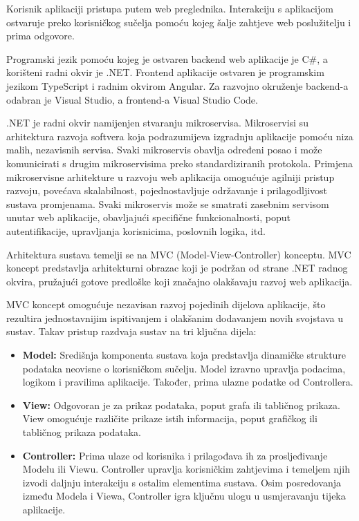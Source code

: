 		{Korisnik aplikaciji pristupa putem web preglednika. Interakciju s aplikacijom ostvaruje preko korisničkog sučelja pomoću kojeg šalje zahtjeve web poslužitelju i prima odgovore.
			
			Programski jezik pomoću kojeg je ostvaren backend web aplikacije je C\#, a korišteni radni okvir je .NET. Frontend aplikacije ostvaren je programskim jezikom
			TypeScript i radnim okvirom Angular. Za razvojno okruženje backend-a odabran je Visual Studio, a frontend-a Visual Studio Code.
			
			.NET je radni okvir namijenjen stvaranju mikroservisa. Mikroservisi su arhitektura razvoja softvera koja podrazumijeva izgradnju aplikacije pomoću niza malih, nezavisnih servisa. Svaki mikroservis obavlja određeni posao i može komunicirati s drugim mikroservisima preko standardiziranih protokola. Primjena mikroservisne arhitekture u razvoju web aplikacija omogućuje agilniji pristup razvoju, povećava skalabilnost, pojednostavljuje održavanje i prilagodljivost sustava promjenama. Svaki mikroservis može se smatrati zasebnim servisom unutar web aplikacije, obavljajući specifične funkcionalnosti, poput autentifikacije, upravljanja korisnicima, poslovnih logika, itd.
			
			Arhitektura sustava temelji se na MVC (Model-View-Controller) konceptu. MVC koncept predstavlja arhitekturni obrazac koji je podržan od strane .NET radnog okvira, pružajući gotove predloške koji značajno olakšavaju razvoj web aplikacija.
			
			MVC koncept omogućuje nezavisan razvoj pojedinih dijelova aplikacije, što rezultira jednostavnijim ispitivanjem i olakšanim dodavanjem novih svojstava u sustav. Takav pristup razdvaja sustav na tri ključna dijela:
			
			\begin{itemize}
				\item \textbf{Model:} Središnja komponenta sustava koja predstavlja dinamičke strukture podataka neovisne o korisničkom sučelju. Model izravno upravlja podacima, logikom i pravilima aplikacije. Također, prima ulazne podatke od Controllera.
				
				\item \textbf{View:} Odgovoran je za prikaz podataka, poput grafa ili tabličnog prikaza. View omogućuje različite prikaze istih informacija, poput grafičkog ili tabličnog prikaza podataka.
				
				\item \textbf{Controller:} Prima ulaze od korisnika i prilagođava ih za prosljeđivanje Modelu ili Viewu. Controller upravlja korisničkim zahtjevima i temeljem njih izvodi daljnju interakciju s ostalim elementima sustava. Osim posredovanja između Modela i Viewa, Controller igra ključnu ulogu u usmjeravanju tijeka aplikacije.
			\end{itemize}
			
}

